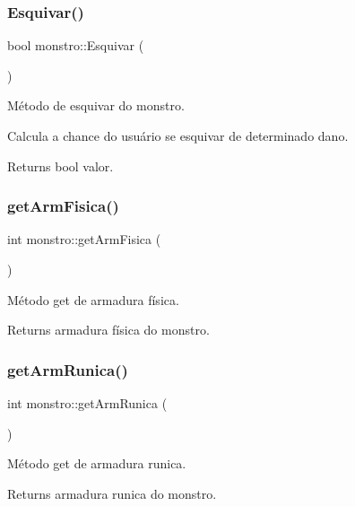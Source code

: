 \subsubsection{\texorpdfstring{Esquivar()}{Esquivar()}}
{\footnotesize\ttfamily bool monstro\+::\+Esquivar (\begin{DoxyParamCaption}{ }\end{DoxyParamCaption})}



Método de esquivar do monstro. 

Calcula a chance do usuário se esquivar de determinado dano. \begin{DoxyReturn}{Returns}
bool valor. 
\end{DoxyReturn}
\mbox{\label{classmonstro_adc603e8df99ff928bdb1ffc1a95f604f}} 
\subsubsection{\texorpdfstring{get\+Arm\+Fisica()}{getArmFisica()}}
{\footnotesize\ttfamily int monstro\+::get\+Arm\+Fisica (\begin{DoxyParamCaption}{ }\end{DoxyParamCaption})}



Método get de armadura física. 

\begin{DoxyReturn}{Returns}
armadura física do monstro. 
\end{DoxyReturn}
\mbox{\label{classmonstro_abc73db4e55eb8c72aa433d4da43bd997}} 
\subsubsection{\texorpdfstring{get\+Arm\+Runica()}{getArmRunica()}}
{\footnotesize\ttfamily int monstro\+::get\+Arm\+Runica (\begin{DoxyParamCaption}{ }\end{DoxyParamCaption})}



Método get de armadura runica. 

\begin{DoxyReturn}{Returns}
armadura runica do monstro. 
\end{DoxyReturn}
\mbox{\label{classmonstro_a5fbec06d53697ed81f0ca64136f7eb85}} 
